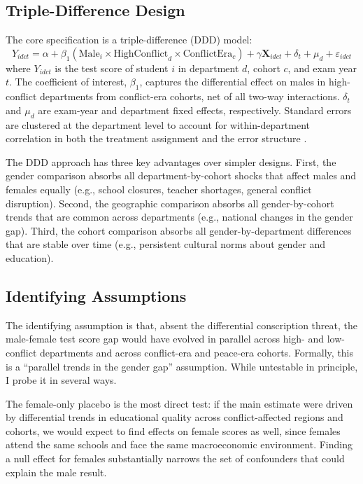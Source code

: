 \documentclass[12pt]{article}
\begin{document}
\subsection{Triple-Difference Design}

The core specification is a triple-difference (DDD) model:
\begin{equation}
Y_{idct} = \alpha + \beta_1 (\text{Male}_i \times \text{HighConflict}_d \times \text{ConflictEra}_c) + \gamma \mathbf{X}_{idct} + \delta_t + \mu_d + \varepsilon_{idct}
\label{eq:ddd}
\end{equation}
where $Y_{idct}$ is the test score of student $i$ in department $d$, cohort $c$, and exam year $t$. The coefficient of interest, $\beta_1$, captures the differential effect on males in high-conflict departments from conflict-era cohorts, net of all two-way interactions. $\delta_t$ and $\mu_d$ are exam-year and department fixed effects, respectively. Standard errors are clustered at the department level to account for within-department correlation in both the treatment assignment and the error structure \citep{angrist1999}.

The DDD approach has three key advantages over simpler designs. First, the gender comparison absorbs all department-by-cohort shocks that affect males and females equally (e.g., school closures, teacher shortages, general conflict disruption). Second, the geographic comparison absorbs all gender-by-cohort trends that are common across departments (e.g., national changes in the gender gap). Third, the cohort comparison absorbs all gender-by-department differences that are stable over time (e.g., persistent cultural norms about gender and education).

\subsection{Identifying Assumptions}

The identifying assumption is that, absent the differential conscription threat, the male-female test score gap would have evolved in parallel across high- and low-conflict departments and across conflict-era and peace-era cohorts. Formally, this is a ``parallel trends in the gender gap'' assumption. While untestable in principle, I probe it in several ways.

The female-only placebo is the most direct test: if the main estimate were driven by differential trends in educational quality across conflict-affected regions and cohorts, we would expect to find effects on female scores as well, since females attend the same schools and face the same macroeconomic environment. Finding a null effect for females substantially narrows the set of confounders that could explain the male result.
\end{document}
